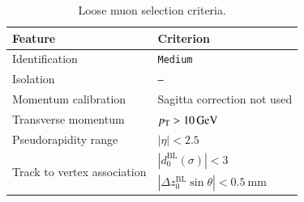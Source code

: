 \begin{table}[ht]
  \caption{Loose muon selection criteria.}%
  \label{tab:object:loose_muon}
  \centering
  \begin{tabular}[ht]{ll}
    \toprule
    Feature & Criterion \\
    \midrule
    Identification & \texttt{Medium} \\
    Isolation  & \texttt{--}\\
    Momentum calibration & Sagitta correction not used \\
    Transverse momentum& \(\pT > \SI[parse-numbers=false]{10}{\GeV}\) \\
     Pseudorapidity range &  \(|\eta| < 2.5\) \\
     \midrule
    \multirow{2}{*}{Track to vertex association}&  \(|d_{0}^{\text{BL}}(\sigma)| < 3\)  \\
    & \(|\Delta z_{0}^{\text{BL}} \sin{\theta}| < \SI[parse-numbers=false]{0.5}{\mm}\) \\
    \bottomrule
  \end{tabular}
\end{table}





